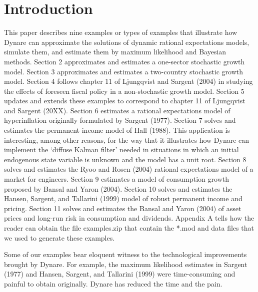 \documentclass[a4paper,12pt]{scrartcl} %
\begin{document}
\clearpage                %




\tableofcontents
\clearpage
\listoffigures
\clearpage
\listoftables
\clearpage



\setcounter{page}{1}        %

\section{Introduction}

This paper describes nine examples or types of examples that illustrate how Dynare can approximate the solutions of dynamic rational expectations models, simulate them, and estimate them by maximum likelihood and Bayesian methods. Section 2 approximates and estimates a one-sector stochastic growth model. Section 3 approximates and estimates a two-country stochastic growth model. Section 4 follows chapter 11 of Ljungqvist and Sargent (2004) in studying the effects of foreseen fiscal policy in a non-stochastic growth model. Section 5 updates and extends these examples to correspond to chapter 11 of Ljungqvist and Sargent (20XX). Section 6 estimates a rational expectations model of hyperinflation originally formulated by Sargent (1977). Section 7 solves and estimates the permanent income model of Hall (1988). This application is interesting, among other reasons, for the way that it illustrates how Dynare can implement the ‘diffuse Kalman filter’ needed in situations in which an initial endogenous state variable is unknown and the model has a unit root. Section 8 solves and estimates the Ryoo and Rosen (2004) rational expectations model of a market for engineers. Section 9 estimates a model of consumption growth proposed by Bansal and Yaron (2004). Section 10 solves and estimates the Hansen, Sargent, and Tallarini (1999) model of robust permanent income and pricing. Section 11 solves and estimates the Bansal and Yaron (2004) of asset prices and long-run risk in consumption and dividends. Appendix A tells how the reader can obtain the file examples.zip that contain the *.mod and data files that we used to generate these examples.

Some of our examples bear eloquent witness to the technological improvements brought by Dynare. For example, the maximum likelihood estimates in Sargent (1977) and Hansen, Sargent, and Tallarini (1999) were time-consuming and painful to obtain originally. Dynare has reduced the time and the pain.
\end{document}
